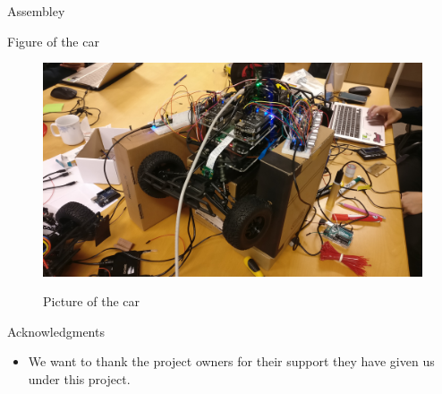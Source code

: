 \documentclass[final,hyperref={pdfpagelabels=false}]{beamer}
\begin{document}
\begin{frame}[t]
\begin{columns}[t]
\begin{column}{.465\textwidth}
\begin{block}{Assembley}
\begin{itemize}
        \end{itemize}
    
    \end{block}
\begin{block}{Figure of the car}
    \begin{figure}
        \includegraphics[width=1\linewidth]{car1.jpg}
        \label{fig:car1}
        \caption{Picture of the car}
    \end{figure}
\end{block}


%
%



\begin{block}{Acknowledgments}

\begin{itemize}
\item We want to thank the project owners for their support they have given us under this project. 
\end{itemize}

\end{block}



\end{column}
\end{columns}
\end{frame}
\end{document}
